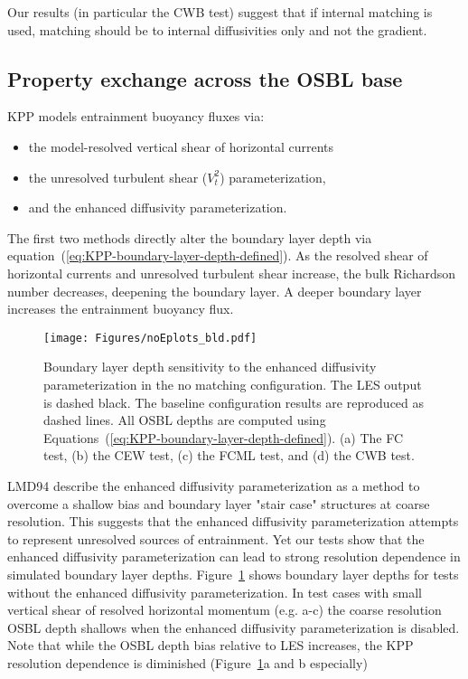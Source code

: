 \documentclass[preprint,12pt,authoryear]{agujournal}
\begin{document}
Our results (in particular the CWB test) suggest that if internal matching is used, matching should be to internal diffusivities only and not the gradient.

\subsection{Property exchange across the OSBL base}
\label{section:PEresults}
KPP models entrainment buoyancy fluxes via:
\begin{itemize}
\item the model-resolved vertical shear of horizontal currents
\item the unresolved turbulent shear ($V_t^2$) parameterization,
\item and the enhanced diffusivity parameterization.
\end{itemize}
The first two methods directly alter the boundary layer depth via equation~(\ref{eq:KPP-boundary-layer-depth-defined}).  As the resolved shear of horizontal currents and unresolved turbulent shear increase, the bulk Richardson number decreases, deepening the boundary layer.  A deeper boundary layer increases the entrainment buoyancy flux.

\begin{figure}
\centering\texttt{[image: Figures/noEplots\_bld.pdf]}
\caption{Boundary layer depth sensitivity to the enhanced diffusivity parameterization in the no matching configuration.  The LES output is dashed black.  The baseline configuration results are reproduced as dashed lines.  All OSBL depths are computed using Equations~(\ref{eq:KPP-boundary-layer-depth-defined}). (a) The FC test, (b) the CEW test, (c) the FCML test, and (d) the CWB test.}
\label{fig:noEntrainmentBLD}
\end{figure}

LMD94 describe the enhanced diffusivity parameterization as a method to overcome a shallow bias and boundary layer "stair case" structures at coarse resolution.  This suggests that the enhanced diffusivity parameterization attempts to represent unresolved sources of entrainment.  Yet our tests show that the enhanced diffusivity parameterization can lead to strong resolution dependence in simulated boundary layer depths.  Figure~\ref{fig:noEntrainmentBLD} shows boundary layer depths for tests without the enhanced diffusivity parameterization.  In test cases with small vertical shear of resolved horizontal momentum (e.g. a-c) the coarse resolution OSBL depth shallows when the enhanced diffusivity parameterization is disabled.  Note that while the OSBL depth bias relative to LES increases, the KPP resolution dependence is diminished (Figure~\ref{fig:noEntrainmentBLD}a and b especially)
\end{document}
